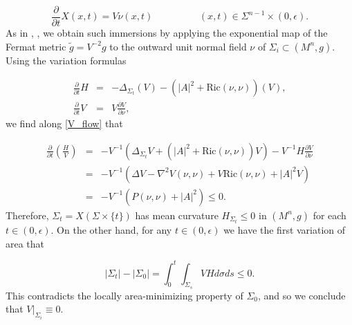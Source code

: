 \documentclass[12pt]{amsart}
\theoremstyle{definition}
\numberwithin{equation}{section}
\begin{document}
\begin{equation} \label{V_flow}
    \frac{\partial}{\partial t} X(x,t) = V \nu(x,t) \hspace{2cm} (x,t) \in \Sigma^{n-1} \times (0, \epsilon).
\end{equation}
As in \cite{HMM17}, \cite{G93}, we obtain such immersions by applying the exponential map of the Fermat metric $\widetilde{g} = V^{-2} g$ to the outward unit normal field $\nu$ of $\Sigma_{i} \subset (M^{n},g)$. Using the variation formulas

\begin{eqnarray*}
    \frac{\partial}{\partial t } H &=& -\Delta_{\Sigma_{t}} \left(  V \right) - \left(|A|^{2} + \text{Ric}(\nu,\nu) \right) \left( V \right), \\
    \frac{\partial}{\partial t} V &=& V\frac{\partial V}{\partial \nu},
\end{eqnarray*}
we find along \eqref{V_flow} that

\begin{eqnarray*}
    \frac{\partial} {\partial t} \left( \frac{H}{V} \right) &=& -V^{-1} \left( \Delta_{\Sigma_{t}} V + \left( |A|^{2} + \text{Ric}(\nu,\nu) \right) V \right) - V^{-1} H \frac{\partial V}{\partial \nu} \\
    &=& -V^{-1} \left(\Delta V - \nabla^{2} V(\nu,\nu) + V\text{Ric}(\nu,\nu) + |A|^{2} V \right) \\
    &=& -V^{-1} \left( P(\nu,
    \nu) + |A|^{2} \right) \leq 0. 
\end{eqnarray*}
Therefore, $\Sigma_{t}=X\left( \Sigma \times \{ t \} \right)$ has mean curvature $H_{\Sigma_{t}} \leq 0$ in $(M^{n},g)$ for each $t \in (0,\epsilon)$. On the other hand, for any $t \in (0,\epsilon)$ we have the first variation of area that

\begin{equation}
    |\Sigma_{t}|-|\Sigma_{0}| = \int_{0}^{t} \int_{\Sigma_{s}} VH d\sigma ds \leq 0.
\end{equation}
This contradicts the locally area-minimizing property of $\Sigma_{0}$, and so we conclude that $V|_{\Sigma_{i}} \equiv 0$.
% 
%
\printbibliography[title=References]
\end{document}
